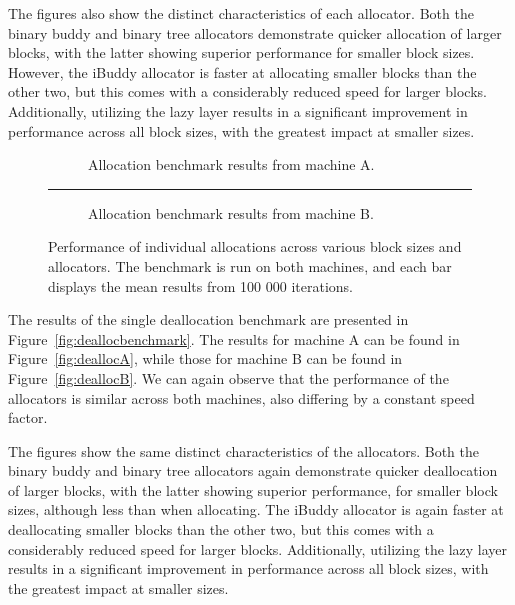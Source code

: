 The figures also show the distinct characteristics of each allocator. Both the binary buddy and binary tree allocators demonstrate quicker allocation of larger blocks, with the latter showing superior performance for smaller block sizes. However, the iBuddy allocator is faster at allocating smaller blocks than the other two, but this comes with a considerably reduced speed for larger blocks. Additionally, utilizing the lazy layer results in a significant improvement in performance across all block sizes, with the greatest impact at smaller sizes.

\begin{figure}[h]
    \centering
    \begin{subfigure}{\textwidth}
        \centering
        \captionsetup{justification=centering}
        
        \caption{Allocation benchmark results from machine A.}
        \label{fig:allocA}
    \end{subfigure}
    \vspace{-0.5cm}
    \rule{\textwidth}{0.1pt}
    \begin{subfigure}{\textwidth}
        \centering
        \captionsetup{justification=centering}
        
        \caption{Allocation benchmark results from machine B.}
        \label{fig:allocB}
    \end{subfigure}
    \caption{Performance of individual allocations across various block sizes and allocators. The benchmark is run on both machines, and each bar displays the mean results from 100 000 iterations.}
    \label{fig:allocbenchmark}
\end{figure}

The results of the single deallocation benchmark are presented in Figure~\ref{fig:deallocbenchmark}. The results for machine A can be found in Figure~\ref{fig:deallocA}, while those for machine B can be found in Figure~\ref{fig:deallocB}. We can again observe that the performance of the allocators is similar across both machines, also differing by a constant speed factor.

The figures show the same distinct characteristics of the allocators. Both the binary buddy and binary tree allocators again demonstrate quicker deallocation of larger blocks, with the latter showing superior performance, for smaller block sizes, although less than when allocating. The iBuddy allocator is again faster at deallocating smaller blocks than the other two, but this comes with a considerably reduced speed for larger blocks. Additionally, utilizing the lazy layer results in a significant improvement in performance across all block sizes, with the greatest impact at smaller sizes.


